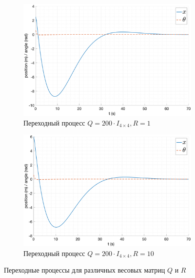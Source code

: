 \begin{figure}[ht!]
\begin{subfigure}[b]{0.45\textwidth}
        \includegraphics[width=\textwidth]{media/plots/LQR/out_8.png}
        \caption{Переходный процесс $Q = 200 \cdot I_{4\times 4}, R = 1$}
    \end{subfigure}
    \begin{subfigure}[b]{0.45\textwidth}
        \centering
        \includegraphics[width=\textwidth]{media/plots/LQR/out_9.png}
        \caption{Переходный процесс $Q = 200 \cdot I_{4\times 4}, R = 10$}
    \end{subfigure}
    \caption{Переходные процессы для различных весовых матриц $Q$ и $R$}
    \label{fig:lqr_controller_qr}
\end{figure} 

